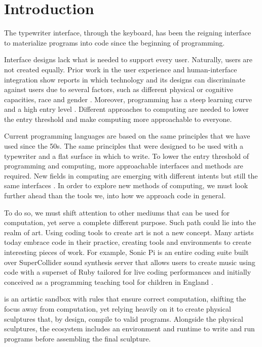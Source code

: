 
\chapter{Introduction}
\label{cha:introduction}
The typewriter interface, through the keyboard, has been the reigning interface to materialize programs into code since the beginning of programming.

Interface designs lack what is needed to support every user. Naturally, users are not created equally.
Prior work in the user experience and human-interface integration show reports in which technology and its designs can discriminate against users due to several factors,
such as different physical or cognitive capacities, race and gender \cite{ko23}.
Moreover, programming has a steep learning curve and a high entry level \cite{bosse17}.
Different approaches to computing are needed to lower the entry threshold and make computing more approachable to everyone.

Current programming languages are based on the same principles that we have used since the 50s.
The same principles that were designed to be used with a typewriter and a flat surface in which to write.
To lower the entry threshold of programming and computing, more approachable interfaces and methods are required.
New fields in computing are emerging with different intents but still the same interfaces \cite{hongji16}.
In order to explore new methods of computing, we must look further ahead than the tools we, into how we approach code in general.

To do so, we must shift attention to other mediums that can be used for computation, yet serve a complete different purpose.
Such path could lie into the realm of art. Using coding tools to create art is not a new concept.
Many artists today embrace code in their practice, creating tools and environments to create interesting pieces of work. 
For example, Sonic Pi is an entire coding suite built over SuperCollider sound synthesis server that allows users to create music using code with a superset of Ruby 
tailored for live coding performances and initially conceived as a programming teaching tool for children in England \cite{aaron16}.

\sculpt is an artistic sandbox with rules that ensure correct computation, shifting the focus away from computation, yet relying heavily on it to create physical sculptures that, by design, compile to valid programs.
Alongside the physical sculptures, the \sculpt ecosystem includes an environment and runtime to write and run programs before assembling the final sculpture.

\endinput